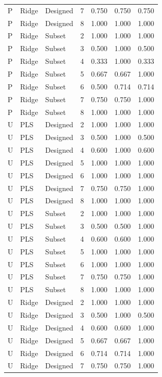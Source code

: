 \documentclass[10pt,a4paper]{article}
\begin{document}
\begin{longtable}{lllrrrr}
P & Ridge & Designed & 7 & 0.750 & 0.750 & 0.750 \\
P & Ridge & Designed & 8 & 1.000 & 1.000 & 1.000 \\
P & Ridge & Subset & 2 & 1.000 & 1.000 & 1.000 \\
P & Ridge & Subset & 3 & 0.500 & 1.000 & 0.500 \\
P & Ridge & Subset & 4 & 0.333 & 1.000 & 0.333 \\
P & Ridge & Subset & 5 & 0.667 & 0.667 & 1.000 \\
P & Ridge & Subset & 6 & 0.500 & 0.714 & 0.714 \\
P & Ridge & Subset & 7 & 0.750 & 0.750 & 1.000 \\
P & Ridge & Subset & 8 & 1.000 & 1.000 & 1.000 \\
U & PLS & Designed & 2 & 1.000 & 1.000 & 1.000 \\
U & PLS & Designed & 3 & 0.500 & 1.000 & 0.500 \\
U & PLS & Designed & 4 & 0.600 & 1.000 & 0.600 \\
U & PLS & Designed & 5 & 1.000 & 1.000 & 1.000 \\
U & PLS & Designed & 6 & 1.000 & 1.000 & 1.000 \\
U & PLS & Designed & 7 & 0.750 & 0.750 & 1.000 \\
U & PLS & Designed & 8 & 1.000 & 1.000 & 1.000 \\
U & PLS & Subset & 2 & 1.000 & 1.000 & 1.000 \\
U & PLS & Subset & 3 & 0.500 & 0.500 & 1.000 \\
U & PLS & Subset & 4 & 0.600 & 0.600 & 1.000 \\
U & PLS & Subset & 5 & 1.000 & 1.000 & 1.000 \\
U & PLS & Subset & 6 & 1.000 & 1.000 & 1.000 \\
U & PLS & Subset & 7 & 0.750 & 0.750 & 1.000 \\
U & PLS & Subset & 8 & 1.000 & 1.000 & 1.000 \\
U & Ridge & Designed & 2 & 1.000 & 1.000 & 1.000 \\
U & Ridge & Designed & 3 & 0.500 & 1.000 & 0.500 \\
U & Ridge & Designed & 4 & 0.600 & 0.600 & 1.000 \\
U & Ridge & Designed & 5 & 0.667 & 0.667 & 1.000 \\
U & Ridge & Designed & 6 & 0.714 & 0.714 & 1.000 \\
U & Ridge & Designed & 7 & 0.750 & 0.750 & 1.000 \\

\end{longtable}
\end{document}
